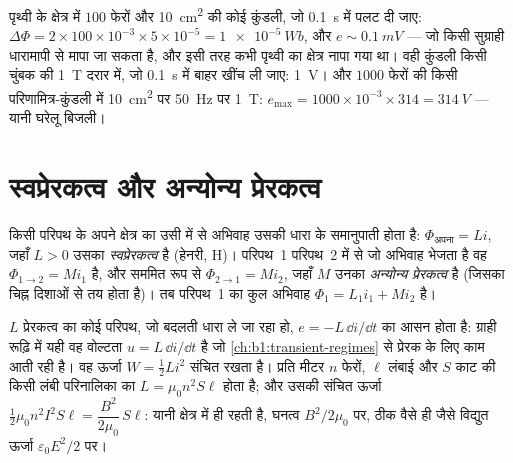 \begin{example}[परिमाण की कोटियाँ]\label{ex:b1:induction:orders}
पृथ्वी के क्षेत्र में $100$ फेरों और \qty{10}{cm^2} की कोई कुंडली, जो
\qty{0.1}{s} में पलट दी जाए: $\Delta\Phi = 2 \times 100 \times 10^{-3} \times 5 \times 10^{-5} = \qty{1e-5}{Wb}$,
और $e \sim \qty{0.1}{mV}$ --- जो किसी सुग्राही धारामापी से मापा जा सकता है,
और इसी तरह कभी पृथ्वी का क्षेत्र नापा गया था। वही कुंडली किसी चुंबक की
\qty{1}{T} दरार में, जो \qty{0.1}{s} में बाहर खींच ली जाए: \qty{1}{V}। और
$1000$ फेरों की किसी परिणामित्र-कुंडली में \qty{10}{cm^2} पर \qty{50}{Hz} पर \qty{1}{T}: $e_{\max} =
1000 \times 10^{-3} \times 314 = \qty{314}{V}$ --- यानी घरेलू बिजली।
\end{example}

\section{स्वप्रेरकत्व और अन्योन्य प्रेरकत्व}

\begin{definition}[प्रेरकत्व]\label{def:b1:induction:inductance}
किसी परिपथ के अपने क्षेत्र का उसी में से अभिवाह उसकी धारा के समानुपाती होता
है: $\Phi_{\text{अपना}} = Li$, जहाँ $L > 0$ उसका \emph{स्वप्रेरकत्व} है
(हेनरी, \unit{H})। परिपथ~1 परिपथ~2 में से जो अभिवाह भेजता है वह
$\Phi_{1 \to 2} = Mi_1$ है, और सममित रूप से $\Phi_{2 \to 1} = Mi_2$, जहाँ $M$
उनका \emph{अन्योन्य प्रेरकत्व} है (जिसका चिह्न दिशाओं से तय होता है)। तब
परिपथ~1 का कुल अभिवाह $\Phi_1 = L_1i_1 + Mi_2$ है।
\end{definition}

\begin{proposition}[प्रेरक; परिनालिका]\label{prop:b1:induction:inductor}
$L$ प्रेरकत्व का कोई परिपथ, जो बदलती धारा ले जा रहा हो, 
$e = -L\,\dd i/\dd t$ का आसन होता है: ग्राही रूढ़ि में यही वह वोल्टता
$u = L\,\dd i/\dd t$ है जो \cref{ch:b1:transient-regimes} से प्रेरक के लिए
काम आती रही है। वह ऊर्जा $W = \tfrac12Li^2$ संचित रखता है।
प्रति मीटर $n$ फेरों, $\ell$ लंबाई और $S$ काट की किसी लंबी परिनालिका का
$L = \mu_0n^2S\ell$ होता है; और उसकी संचित ऊर्जा $\tfrac12\mu_0n^2I^2S\ell =
\dfrac{B^2}{2\mu_0}\,S\ell$: यानी  क्षेत्र में ही रहती है,
घनत्व $B^2/2\mu_0$ पर, ठीक वैसे ही जैसे विद्युत ऊर्जा $\varepsilon_0E^2/2$ पर।
\end{proposition}

